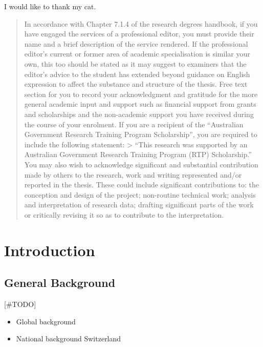 \documentclass[
  letterpaper,
  DIV=11,
  numbers=noendperiod]{scrreprt}
\begin{document}

I would like to thank my cat.

\begin{quote}
In accordance with Chapter 7.1.4 of the research degrees handbook, if
you have engaged the services of a professional editor, you must provide
their name and a brief description of the service rendered. If the
professional editor's current or former area of academic specialisation
is similar your own, this too should be stated as it may suggest to
examiners that the editor's advice to the student has extended beyond
guidance on English expression to affect the substance and structure of
the thesis. Free text section for you to record your acknowledgment and
gratitude for the more general academic input and support such as
financial support from grants and scholarships and the non-academic
support you have received during the course of your enrolment. If you
are a recipient of the ``Australian Government Research Training Program
Scholarship'', you are required to include the following statement:
\textgreater{} ``This research was supported by an Australian Government
Research Training Program (RTP) Scholarship.'' You may also wish to
acknowledge significant and substantial contribution made by others to
the research, work and writing represented and/or reported in the
thesis. These could include significant contributions to: the conception
and design of the project; non-routine technical work; analysis and
interpretation of research data; drafting significant parts of the work
or critically revising it so as to contribute to the interpretation.
\end{quote}

\clearpage{}\setcounter{page}{0}


\hypertarget{introduction}{%
\chapter{Introduction}\label{introduction}}

\hypertarget{background}{%
\section{General Background}\label{background}}

{[}\#TODO{]}

\begin{itemize}
\item
  Global background
\item
  National background Switzerland
\end{itemize}
\end{document}
